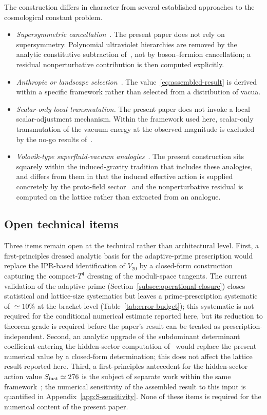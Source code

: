 \documentclass[a4paper,11pt]{article}
\theoremstyle{definition}
\begin{document}
The construction differs in character from several established
approaches to the cosmological constant problem.
\begin{itemize}
\item \emph{Supersymmetric cancellation}~\cite{Martin12}. The
present paper does not rely on supersymmetry. Polynomial
ultraviolet hierarchies are removed by the analytic constitutive
subtraction of~\cite{companion-structural}, not by
boson--fermion cancellation; a residual nonperturbative
contribution is then computed explicitly.
\item \emph{Anthropic or landscape selection}~\cite{Weinberg89}.
The value~\eqref{eq:assembled-result} is derived within a specific
framework rather than selected from a distribution of vacua.
\item \emph{Scalar-only local transmutation.}
The present paper does not invoke a local scalar-adjustment
mechanism. Within the framework used here, scalar-only
transmutation of the vacuum energy at the observed magnitude is
excluded by the no-go results
of~\cite{companion-structural}.
\item \emph{Volovik-type superfluid-vacuum
analogies}~\cite{Volovik03}. The present construction sits squarely within the induced-gravity
tradition that includes these analogies, and differs from them in
that the induced effective action is supplied concretely by the
proto-field sector~\cite{companion-structural} and the
nonperturbative residual is computed on the lattice rather than
extracted from an analogue.
\end{itemize}

\subsection{Open technical items}
\label{subsec:discussion-open}

Three items remain open at the technical rather than architectural
level. First, a first-principles
dressed analytic basis for the adaptive-prime prescription would replace the IPR-based identification of $V_{20}$ by a closed-form construction capturing
the compact-$T^4$ dressing of the moduli-space tangents. The current validation of the adaptive prime (Section~\ref{subsec:operational-closure}) closes statistical and lattice-size systematics but leaves a prime-prescription systematic of $\simeq 10\%$ at the bracket level (Table~\ref{tab:error-budget}); this systematic is not required for the conditional numerical estimate reported here, but its reduction to theorem-grade is required before the paper's result can be treated as prescription-independent. Second, an analytic upgrade of the subdominant determinant
coefficient entering the hidden-sector computation
of~\cite{companion-structural} would replace the present numerical
value by a closed-form determination; this does not affect the
lattice result reported here. Third, a first-principles antecedent
for the hidden-sector action value $S_{\rm inst} \simeq 276$ is
the subject of separate work within the same
framework~\cite{companion-structural}; the numerical sensitivity
of the assembled result to this input is quantified in
Appendix~\ref{app:S-sensitivity}. None of these items is required
for the numerical content of the present paper.
\end{document}
